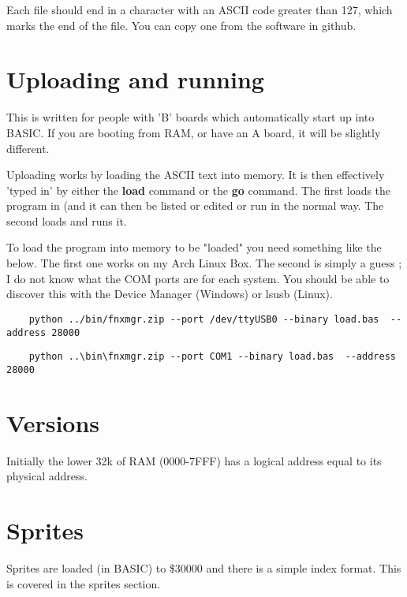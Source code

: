 Each file should end in a character with an ASCII code greater than 127, which marks the end of the file.  You can copy one from the software in github.

\section{Uploading and running}

This is written for people with 'B' boards which automatically start up into BASIC. If you are booting from RAM, or have an A board, it will be slightly different.

Uploading works by loading the ASCII text into memory. It is then effectively 'typed in' by either the \textbf{load} command or the \textbf{go} command. The first loads the program in (and it can then be listed or edited or run in the normal way. The second loads and runs it.

To load the program into memory to be "loaded" you need something like the below. The first one works on my Arch Linux Box. The second is simply a guess ; I do not know what the COM ports are for each system. You should be able to discover this with the Device Manager (Windows) or lsusb (Linux).

\begin{verbatim}
	python ../bin/fnxmgr.zip --port /dev/ttyUSB0 --binary load.bas  --address 28000
\end{verbatim}

\begin{verbatim}
	python ..\bin\fnxmgr.zip --port COM1 --binary load.bas  --address 28000
\end{verbatim}

\section{Versions}

Initially the lower 32k of RAM (0000-7FFF) has a logical address equal to its physical address. 

\section{Sprites}
Sprites are loaded (in BASIC) to \$30000 and there is a simple index format. This is covered in the sprites section.
